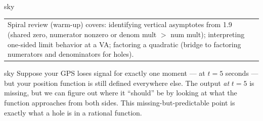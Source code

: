 \documentclass[10pt]{article}
\begin{document}
\begin{skillbox}{sky}
    \begin{tabularx}{\linewidth}{@{}X@{}}
        Spiral review (warm-up) covers: identifying vertical asymptotes from 1.9 (shared zero,
        numerator nonzero or denom mult $>$ num mult); interpreting one-sided limit behavior at a
        VA; factoring a quadratic (bridge to factoring numerators and denominators for holes).
    \end{tabularx}
\end{skillbox}

\begin{skillbox}[Hook]{sky}
Suppose your GPS loses signal for exactly one moment --- at $t = 5$ seconds --- but your
position function is still defined everywhere else. The output \textit{at} $t = 5$ is missing,
but we can figure out where it ``should'' be by looking at what the function approaches from
both sides. This missing-but-predictable point is exactly what a hole is in a rational function.
\end{skillbox}
\end{document}
